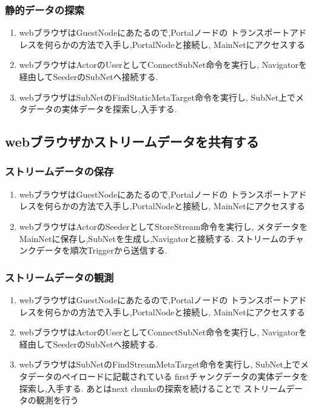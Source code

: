 \documentclass[sotsuron]{jcsie}
\begin{document}
\subsubsection{静的データの探索}
\begin{enumerate}
	\item 
	      webブラウザはGuestNodeにあたるので,Portalノードの
	      トランスポートアドレスを何らかの方法で入手し,PortalNodeと接続し,
	      MainNetにアクセスする
	      \\
	\item
	      webブラウザはActorのUserとしてConnectSubNet命令を実行し,
	      Navigatorを経由してSeederのSubNetへ接続する.
	      \\
	\item 
	      webブラウザはSubNetのFindStaticMetaTarget命令を実行し,
	      SubNet上でメタデータの実体データを探索し,入手する.
\end{enumerate}

\subsection{webブラウザかストリームデータを共有する}
\subsubsection{ストリームデータの保存}
\begin{enumerate}
	\item 
	      webブラウザはGuestNodeにあたるので,Portalノードの
	      トランスポートアドレスを何らかの方法で入手し,PortalNodeと接続し,
	      MainNetにアクセスする
	      \\
	\item
	      webブラウザはActorのSeederとしてStoreStream命令を実行し,
	      メタデータをMainNetに保存し,SubNetを生成し,Navigatorと接続する.
	      ストリームのチャンクデータを順次Triggerから送信する.	
\end{enumerate}
\subsubsection{ストリームデータの観測}
\begin{enumerate}
	\item 
	      webブラウザはGuestNodeにあたるので,Portalノードの
	      トランスポートアドレスを何らかの方法で入手し,PortalNodeと接続し,
	      MainNetにアクセスする
	      \\
	\item
	      webブラウザはActorのUserとしてConnectSubNet命令を実行し,
	      Navigatorを経由してSeederのSubNetへ接続する.
	      \\
	\item 
	      webブラウザはSubNetのFindStreamMetaTarget命令を実行し,
	      SubNet上でメタデータのペイロードに記載されている
	      firstチャンクデータの実体データを探索し,入手する.
	      あとはnext chunksの探索を続けることで
	      ストリームデータの観測を行う
\end{enumerate}
\end{document}
